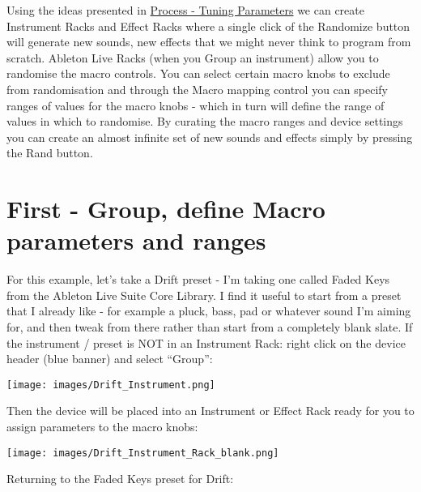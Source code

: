 \documentclass[
  12pt,
  letterpaper,
  oneside,
  open=any]{scrbook}
\begin{document}
\begin{tcolorbox}[enhanced jigsaw, colback=white, rightrule=.15mm, toprule=.15mm, arc=.35mm, opacitybacktitle=0.6, coltitle=black, leftrule=.75mm, bottomtitle=1mm, toptitle=1mm, left=2mm, bottomrule=.15mm, titlerule=0mm, colbacktitle=quarto-callout-tip-color!10!white, colframe=quarto-callout-tip-color-frame, title=\textcolor{quarto-callout-tip-color}{\faLightbulb}\hspace{0.5em}{Key idea}, breakable, opacityback=0]

Using the ideas presented in
\hyperref[Chapter-008-Process-Tuning_Parameters]{Process - Tuning
Parameters} we can create Instrument Racks and Effect Racks where a
single click of the Randomize button will generate new sounds, new
effects that we might never think to program from scratch. Ableton Live
Racks (when you Group an instrument) allow you to randomise the macro
controls. You can select certain macro knobs to exclude from
randomisation and through the Macro mapping control you can specify
ranges of values for the macro knobs - which in turn will define the
range of values in which to randomise. By curating the macro ranges and
device settings you can create an almost infinite set of new sounds and
effects simply by pressing the Rand button.

\end{tcolorbox}

\section{First - Group, define Macro parameters and
ranges}\label{first---group-define-macro-parameters-and-ranges}

For this example, let's take a Drift preset - I'm taking one called
Faded Keys from the Ableton Live Suite Core Library. I find it useful to
start from a preset that I already like - for example a pluck, bass, pad
or whatever sound I'm aiming for, and then tweak from there rather than
start from a completely blank slate. If the instrument / preset is NOT
in an Instrument Rack: right click on the device header (blue banner)
and select ``Group'':

\texttt{[image: images/Drift\_Instrument.png]}

Then the device will be placed into an Instrument or Effect Rack ready
for you to assign parameters to the macro knobs:

\texttt{[image: images/Drift\_Instrument\_Rack\_blank.png]}

Returning to the Faded Keys preset for Drift:
\end{document}
